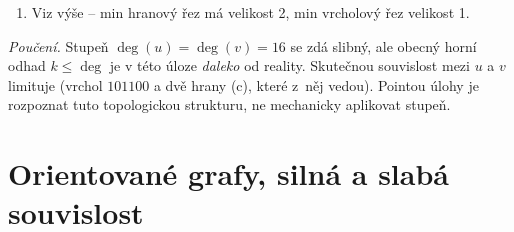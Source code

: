 \documentclass[11pt,a4paper]{article}
\begin{document}
\begin{priklad}
\begin{enumerate}[label=(\arabic*)]
  \medskip\noindent\textbf{Min hranový řez = 2.} Stačí odebrat 2 hrany (c) incidentní s $101100$:
  \[ R = \bigl\{\{101100,111010\},\ \{101100,010110\}\bigr\}. \]
  Po jejich odebrání zbude mezi dvojicemi $\{S_{00},S_{10}\}$ a $\{S_{01},S_{11}\}$ pouze hrana (c) $\{010110,111011\}$, jejíž konec $010110\in S_{01}$ je ze $S_{00}$ nedosažitelný (žádná hrana (a) ani (b) nevede ze $S_{00}$ do $S_{01}$).

  Z Mengerovy hranové věty plyne: max počet hranově disjunktních $u$-$v$ cest = 2. Konkrétní dvě hranově disjunktní cesty:
  \begin{align*}
    P_1:&\quad 000000 \xrightarrow{(a)} 100000 \xrightarrow{(b)} 101100 \xrightarrow{(c)} 111010 \xrightarrow{(b)} 111111,\\
    P_2:&\quad 000000 \xrightarrow{(b)} 001100 \xrightarrow{(a)} 101100 \xrightarrow{(c)} 010110 \xrightarrow{(a)} 110110 \xrightarrow{(b)} 111111.
  \end{align*}
  Obě cesty procházejí vrcholem $101100$ (vrcholově \emph{nejsou} disjunktní), ale použité hrany se neopakují. Že nejde rozšířit na 3 hranově disjunktní cesty, plyne z toho, že z vrcholu $101100$ vedou jen 2 hrany do $\{S_{01},S_{11}\}$ (obě hrany (c) -- první a druhá), a obě musí být v cestách použity.

  \medskip\noindent\textbf{Závěry:}
  \begin{itemize}
    \item Max hranově disjunktních $u$-$v$ cest = $\boxed{2}$, min hranový řez = $\boxed{2}$.
    \item Max vrcholově disjunktních $u$-$v$ cest = $\boxed{1}$, min vrcholový řez = $\boxed{1}$.
  \end{itemize}

  \item Viz výše -- min hranový řez má velikost 2, min vrcholový řez velikost 1.
\end{enumerate}

\noindent\emph{Poučení.} Stupeň $\deg(u)=\deg(v)=16$ se zdá slibný, ale obecný horní odhad $k\le\deg$ je v této úloze \emph{daleko} od reality. Skutečnou souvislost mezi $u$ a $v$ limituje  (vrchol $101100$ a dvě hrany (c), které z~něj vedou). Pointou úlohy je rozpoznat tuto topologickou strukturu, ne mechanicky aplikovat stupeň.
\end{priklad}

\section{Orientované grafy, silná a slabá souvislost}
\end{document}
